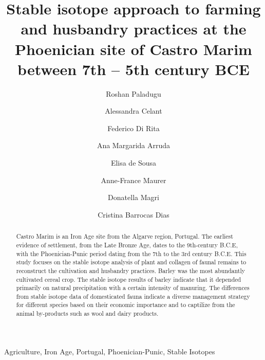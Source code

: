 \documentclass[review]{elsarticle} %
\begin{document}
\begin{frontmatter}

  \title{Stable isotope approach to farming and husbandry practices at the Phoenician site of Castro Marim between 7th -- 5th century BCE}
    \author[Universidade de Évora,Laboratório HERCULES,SAPIENZA Università di Roma]{Roshan Paladugu}
    \author[SAPIENZA Università di Roma]{Alessandra Celant}
    \author[SAPIENZA Università di Roma]{Federico Di Rita}
    \author[Universidade de Lisboa]{Ana Margarida Arruda}
    \author[Universidade de Lisboa]{Elisa de Sousa}
    \author[Universidade de Évora, HERCULES]{Anne-France Maurer}
    \author[SAPIENZA Università di Roma]{Donatella Magri}
    \author[Universidade de Évora,Laboratório HERCULES]{Cristina Barrocas Dias}
      \address[Universidade de Évora]{Departamento de Química, Escola de Ciências e Tecnologia, Universidade de Évora, Colégio Luís António Verney, Rua Romão Ramalho 59, Évora, Portugal (7000-671)}
    \address[Laboratório HERCULES]{Laboratório HERCULES, Universidade de Évora, Palácio do Vimioso, Largo Marquês de Marialva 8, 7000-554 Évora, Portugal}
    \address[SAPIENZA Università di Roma]{Dipartimento di Biologia Ambientale, SAPIENZA Università di Roma, Piazzale A. Moro 5, 00185 Roma, Italy}
    \address[Universidade de Lisboa]{Centro de Arqueologia da Universidade de Lisboa, Faculdade de Letras da Universidade de Lisboa, Alameda da Universidade, 1600-214, Lisboa, Portugal}
  
  \begin{abstract}
  Castro Marim is an Iron Age site from the Algarve region, Portugal. The earliest evidence of settlement, from the Late Bronze Age, dates to the 9th-century B.C.E, with the Phoenician-Punic period dating from the 7th to the 3rd century B.C.E. This study focuses on the stable isotope analysis of plant and collagen of faunal remains to reconstruct the cultivation and husbandry practices. Barley was the most abundantly cultivated cereal crop. The stable isotope results of barley indicate that it depended primarily on natural precipitation with a certain intensity of manuring. The differences from stable isotope data of domesticated fauna indicate a diverse management strategy for different species based on their economic importance and to captilize from the animal by-products such as wool and dairy products.
  \end{abstract}
   \begin{keyword} Agriculture, Iron Age, Portugal, Phoenician-Punic, Stable Isotopes\end{keyword}
 \end{frontmatter}
\end{document}
